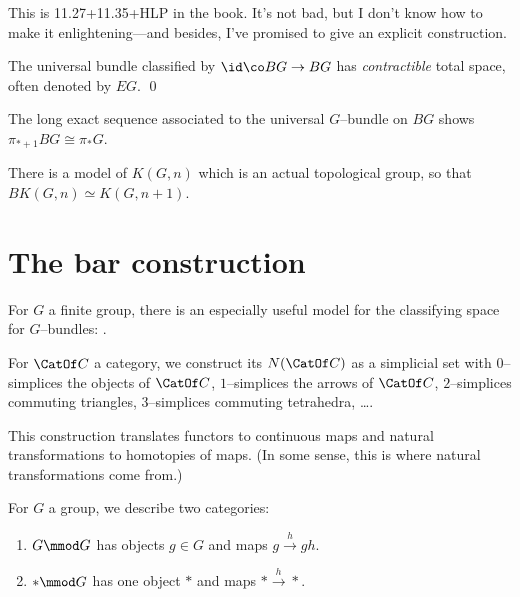 \begin{remark}
This is 11.27+11.35+HLP in the book.  It's not bad, but I don't know how to make it enlightening---and besides, I've promised to give an explicit construction.
\end{remark}

\begin{corollary}
The universal bundle classified by $\id\co BG \to BG$ has \emph{contractible} total space, often denoted by $EG$. \qed
\end{corollary}

\begin{corollary}
The long exact sequence associated to the universal $G$--bundle on $BG$ shows $\pi_{* + 1} BG \cong \pi_* G$.
\end{corollary}

\begin{remark}
There is a model of $K(G, n)$ which is an actual topological group, so that $BK(G, n) \simeq K(G, n+1)$.
\end{remark}




\section{The bar construction}

For $G$ a finite group, there is an especially useful model for the classifying space for $G$--bundles: .

\begin{definition}
For $\CatOf C$ a category, we construct its  $N(\CatOf C)$ as a simplicial set with $0$--simplices the objects of $\CatOf C$, $1$--simplices the arrows of $\CatOf C$, $2$--simplices commuting triangles, $3$--simplices commuting tetrahedra, \ldots .
\end{definition}

\begin{remark}
This construction translates functors to continuous maps and natural transformations to homotopies of maps.  (In some sense, this is where natural transformations come from.)
\end{remark}

\begin{example}
For $G$ a group, we describe two categories:
\begin{enumerate}
    \item $G \mmod G$ has objects $g \in G$ and maps $g \xrightarrow h gh$.
    \item $* \mmod G$ has one object $*$ and maps $* \xrightarrow h *$.
\end{enumerate}
\end{example}


